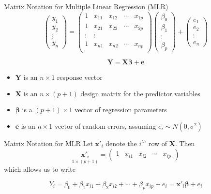 \documentclass[11pt]{beamer}
\begin{document}
\begin{frame}{Matrix Notation for Multiple Linear Regression (MLR)}
\[
\begin{pmatrix}
y_1\\
y_2\\
\vdots\\
y_n
\end{pmatrix}
=
\begin{pmatrix}
1 & x_{11} & x_{12} & \cdots & x_{1p}\\
1 & x_{21} & x_{22} & \cdots & x_{2p}\\
\vdots & \vdots & & & \\
1 & x_{n1} & x_{n2} & \cdots & x_{np}\\
\end{pmatrix}
\begin{pmatrix}
\beta_0\\
\beta_1\\
\vdots\\
\beta_p
\end{pmatrix}
+
\begin{pmatrix}
e_1\\
e_2\\
\vdots\\
e_n
\end{pmatrix}
\]

$$\bm{Y} = \bm{X} \bm{\beta} + \bm{e}$$

\begin{itemize}
\item $\bm{Y}$ is an $n \times 1$ response vector
\item $\bm{X}$ is an $n \times (p+1)$ design matrix for the predictor variables
\item $\bm{\beta}$ is a $(p+1) \times 1$ vector of regression parameters
\item $\bm{e}$ is an $n \times 1$ vector of random errors, assuming $e_i \sim N(0, \sigma^2)$
\end{itemize}
\end{frame}

\begin{frame}{Matrix Notation for MLR}
Let $\bm{x'}_i$ denote the $i^{th}$ row of $\bm{X}$.  Then
\[
\underset{1 \times (p + 1)}{\bm{x'}_i} = 
\begin{pmatrix}
1 & x_{i1} & x_{i2} & \cdots & x_{ip}
\end{pmatrix}
\]
which allows us to write

$$Y_i = \beta_0 + \beta_1 x_{i1} + \beta_2 x_{i2} + \cdots + \beta_p x_{ip}  + e_i = \bm{x'}_i \bm{\beta} + e_i$$\\
\end{frame}
\end{document}
